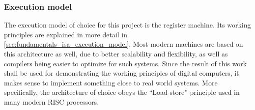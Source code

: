 \subsubsection{Execution model}

The execution model of choice for this project is the register machine. Its working principles are explained in more detail in \autoref{sec:fundamentals_isa_execution_model}. Most modern machines are based on this architecture as well, due to better scalability and flexibility, as well as compilers being easier to optimize for such systems. Since the result of this work shall be used for demonstrating the working principles of digital computers, it makes sense to implement something close to real world systems. More specifically, the architecture of choice obeys the ``Load-store'' principle used in many modern RISC processors.
